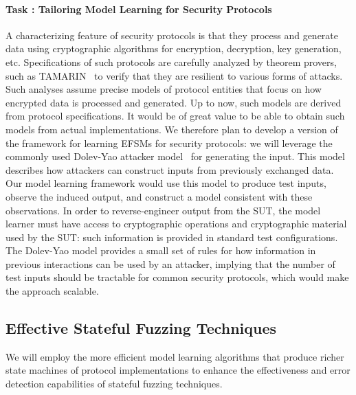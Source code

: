 \documentclass[11pt]{article}
\newcommand{\system}[1]{\mbox{\textsf{#1}}}
\newcounter{Task}
\newcommand{\task}[1]{\addtocounter{Task}{1}\paragraph{Task \theTask: #1}}
\newcommand{\significance}[1]{\vspace*{-0.5em}%
  \begin{quoting}\noindent\textbf{Significance:} #1\end{quoting}}
\newcommand{\myparagraph}{}
\let\myparagraph=\paragraph
\renewcommand{\paragraph}{\vspace{-3mm}\myparagraph}
\begin{document}
\task{Tailoring Model Learning for Security Protocols}
A characterizing feature of security protocols is that they process and generate data using cryptographic algorithms for encryption, decryption, key generation, etc. Specifications of such protocols are carefully analyzed by theorem provers, such as \system{TAMARIN}~\cite{TAMARIN@CAV-13} to verify that they are resilient to various forms of attacks. Such analyses assume precise models of protocol entities that focus on how encrypted data is processed and generated. Up to now, such models are derived from protocol specifications. It would be of great value to be able to obtain such models from actual implementations. We therefore plan to develop a version of the framework for learning EFSMs for security protocols: we
will leverage the commonly used Dolev-Yao attacker model~\cite{DolevYao83} for generating the input. This model describes how attackers can construct inputs from previously exchanged data. Our
model learning framework would use this model to produce test inputs, observe the induced output, and construct a model consistent with these observations.
In order to reverse-engineer output from the SUT, the model learner must have access to cryptographic operations and cryptographic material used by the SUT:
such information is provided in standard test configurations.
The Dolev-Yao model provides a small set of rules for how information in previous interactions can be used by an attacker, implying that the number of test inputs should be tractable for common security protocols, which would make the approach scalable.


\subsection{Effective Stateful Fuzzing Techniques}
We will employ the more efficient model learning algorithms that produce
richer state machines of protocol implementations to enhance the effectiveness
and error detection capabilities of stateful fuzzing techniques.
\end{document}

